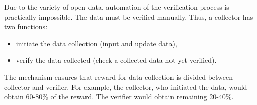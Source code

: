 Due to the variety of open data, automation of the verification process is practically impossible.
The data must be verified manually.
Thus, a collector has two functions:
\begin{itemize}
    \item initiate the data collection (input and update data),
    \item verify the data collected (check a collected data not yet verified).
\end{itemize}

The mechanism ensures that reward for data collection is divided between collector and verifier.
For example, the collector, who initiated the data, would obtain 60-80\% of the reward.
The verifier would obtain remaining 20-40\%.
